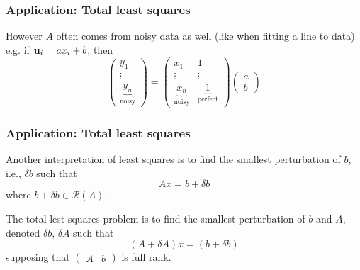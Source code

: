 \documentclass{beamer}
\begin{document}
\begin{frame}\frametitle{Application:  Total least squares}
	However $A$ often comes from noisy data as well (like when fitting a line to data) e.g. if $\mathbf{u}_i = ax_i+b$, then
	\[ 
		\begin{pmatrix}
	    	y_1\\
	    	\vdots\\
	    	\underbrace{y_n}_{\text{noisy}}
	  	\end{pmatrix} 
	  	= \begin{pmatrix}
	    	x_1 & 1\\
	    	\vdots & \vdots \\
	    	\underbrace{x_n}_{\text{noisy}} 
	    	& \underbrace{1}_{\text{perfect}}
	  	  \end{pmatrix}
	  	  \begin{pmatrix}
	    	a\\b
	  	  \end{pmatrix}
	\]	
\end{frame}

\begin{frame}\frametitle{Application:  Total least squares}
	Another interpretation of least squares is to find the \underline{smallest} perturbation of $b$, i.e., $\delta b$ such that
	\[ 
		Ax = b + \delta b 
	\] 
	where $b + \delta b \in \mathcal{R}(A)$.
	
	\vfill
	
	The total lest squares problem is to find the smallest perturbation of $b$ and $A$, denoted $\delta b$, $\delta A$ such that
	\[ 
		(A + \delta A)x = (b + \delta b) 
	\]
	supposing that $\begin{pmatrix} A & b \end{pmatrix}$ is full rank.
\end{frame}
\end{document}
